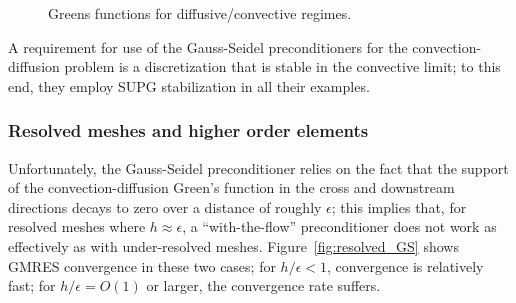 \documentclass[final,leqno]{siamltex}
\begin{document}
\begin{figure}
\caption{Greens functions for diffusive/convective regimes.}
\end{figure}

A requirement for use of the Gauss-Seidel preconditioners for the convection-diffusion problem is a discretization that is stable in the convective limit; to this end, they employ SUPG stabilization in all their examples.  

\subsubsection{Resolved meshes and higher order elements}

Unfortunately, the Gauss-Seidel preconditioner relies on the fact that the support of the convection-diffusion Green's function in the cross and downstream directions decays to zero over a distance of roughly $\epsilon$; this implies that, for resolved meshes where $h\approx \epsilon$, a ``with-the-flow'' preconditioner does not work as effectively as with under-resolved meshes.  Figure~\ref{fig:resolved_GS} shows GMRES convergence in these two cases; for $h/\epsilon < 1$, convergence is relatively fast; for $h/\epsilon = O(1)$ or larger, the convergence rate suffers.  
\end{document}
